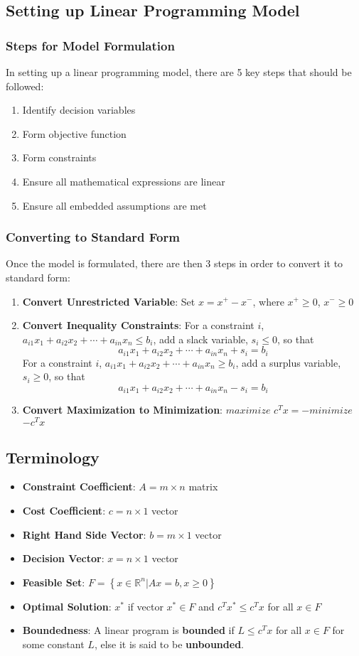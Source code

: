 \documentclass[11pt]{article}
\newcommand{\R}{\mathbb{R}}
\begin{document}
\subsection{Setting up Linear Programming Model}
\subsubsection{Steps for Model Formulation}
In setting up a linear programming model, there are 5 key steps that should be followed: 
\begin{enumerate}
\item Identify decision variables
\item Form objective function
\item Form constraints
\item Ensure all mathematical expressions are linear
\item Ensure all embedded assumptions are met
\end{enumerate}
\subsubsection{Converting to Standard Form}
Once the model is formulated, there are then 3 steps in order to convert it to standard form:
\begin{enumerate}
\item \textbf{Convert Unrestricted Variable}: Set $x = x^+ - x^-$, where $x^+ \geq 0$,  $x^- \geq 0$
\item  \textbf{Convert Inequality Constraints}: For a constraint $i$,  $a_{i1} x_1 + a_{i2}x_2 + \cdots + a_{in} x_n \leq b_i$, add a slack variable, $s_i \leq 0$, so that $$a_{i1} x_1 + a_{i2}x_2 + \cdots + a_{in} x_n + s_i  =b_i$$
For a constraint $i$,  $a_{i1} x_1 + a_{i2}x_2 + \cdots + a_{in} x_n \geq b_i$, add a surplus variable, $s_i \geq 0$, so that $$a_{i1} x_1 + a_{i2}x_2 + \cdots + a_{in} x_n - s_i = b_i$$
\item \textbf{Convert Maximization to Minimization}: $maximize$ $c^Tx = -minimize$ $-c^Tx$
\end{enumerate}
\subsection{Terminology}
\begin{itemize}
\item \textbf{Constraint Coefficient}:  $ A = m \times n$ matrix
\item \textbf{Cost Coefficient}: $ c = n \times 1$  vector
\item \textbf{Right Hand Side Vector}: $ b = m \times 1$  vector
\item \textbf{Decision Vector}: $ x = n \times 1$  vector
\item \textbf{Feasible Set}: $ F = \left\lbrace x \in \R^n  | Ax = b, x\geq 0 \right\rbrace $
\item \textbf{Optimal Solution}: $x ^* $ if vector $x^* \in F $ and $c^T x^* \leq c^Tx$ for all $x \in F$
\item \textbf{Boundedness}: A linear program is \textbf{bounded} if $L \leq c^T x$ for all $x \in F$ for some constant $L$,  else it is said to be \textbf{unbounded}.
\end{itemize}
\end{document}

